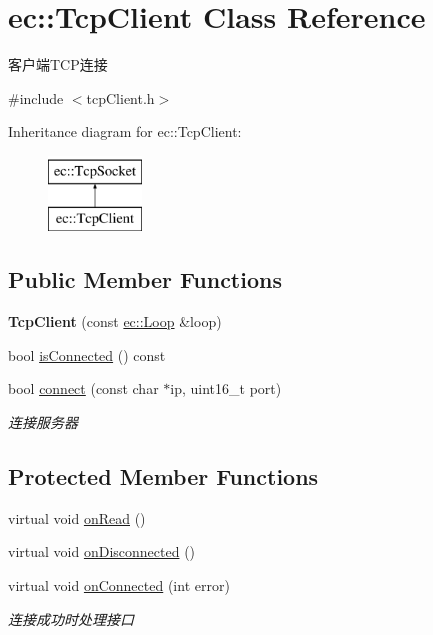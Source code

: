 \hypertarget{classec_1_1TcpClient}{\section{ec\-:\-:Tcp\-Client Class Reference}
\label{classec_1_1TcpClient}
}


客户端\-T\-C\-P连接  




{\ttfamily \#include $<$tcp\-Client.\-h$>$}

Inheritance diagram for ec\-:\-:Tcp\-Client\-:\begin{figure}[H]
\begin{center}
\leavevmode
\includegraphics[height=2.000000cm]{classec_1_1TcpClient}
\end{center}
\end{figure}
\subsection*{Public Member Functions}
\begin{DoxyCompactItemize}
\item 
\hypertarget{classec_1_1TcpClient_aeddd87eefbaf668137546b0232291d8a}{{\bfseries Tcp\-Client} (const \hyperlink{classec_1_1Loop}{ec\-::\-Loop} \&loop)}\label{classec_1_1TcpClient_aeddd87eefbaf668137546b0232291d8a}

\item 
bool \hyperlink{classec_1_1TcpClient_aea5214d714c2c79d05bf0ff224b19e10}{is\-Connected} () const 
\item 
bool \hyperlink{classec_1_1TcpClient_aced7a41792c93f2b8515f2b30b265a3f}{connect} (const char $\ast$ip, uint16\-\_\-t port)
\begin{DoxyCompactList}\small\item\em 连接服务器 \end{DoxyCompactList}\end{DoxyCompactItemize}
\subsection*{Protected Member Functions}
\begin{DoxyCompactItemize}
\item 
virtual void \hyperlink{classec_1_1TcpClient_a5fb6c3ed5388a03de459b6fc233c82ea}{on\-Read} ()
\item 
virtual void \hyperlink{classec_1_1TcpClient_ad528b3c242a0f694d5a0bd1f92a614b8}{on\-Disconnected} ()
\item 
virtual void \hyperlink{classec_1_1TcpClient_adaedc4e778e2de8fca42217e305ed0da}{on\-Connected} (int error)
\begin{DoxyCompactList}\small\item\em 连接成功时处理接口 \end{DoxyCompactList}\end{DoxyCompactItemize}
